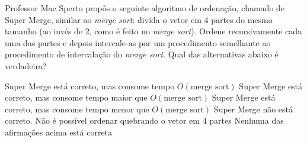 \documentclass[12pt, addpoints]{exam}
\begin{document}
    \begin{questions}

    \newpage
    \question

Professor Mac Sperto propôs o seguinte algoritmo de ordenação, chamado de Super Merge, similar ao \textit{merge sort}: divida o vetor em 4 partes do mesmo tamanho (ao invés de 2, como é feito no \textit{merge sort}). Ordene recursivamente cada uma das partes e depois intercale-as por um procedimento semelhante ao procedimento de intercalação do \textit{merge sort}. Qual das alternativas abaixo é verdadeira?
\begin{choices}
\choice Super Merge está correto, mas consome tempo \( O(\text{merge sort}) \)
\choice Super Merge está correto, mas consome tempo maior que \( O(\text{merge sort}) \)
\choice Super Merge está correto, mas consome tempo menor que \( O(\text{merge sort}) \)
\choice Super Merge não está correto. Não é possível ordenar quebrando o vetor em 4 partes
\choice Nenhuma das afirmações acima está correta
\end{choices}



    \end{questions}
    
\end{document}
